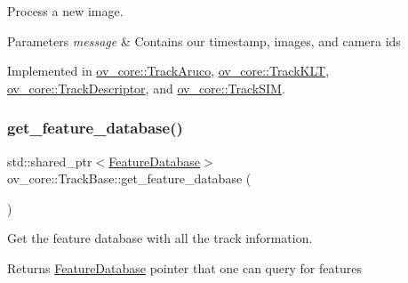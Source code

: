 Process a new image. 


\begin{DoxyParams}{Parameters}
{\em message} & Contains our timestamp, images, and camera ids \\
\hline
\end{DoxyParams}


Implemented in \hyperlink{classov__core_1_1TrackAruco_a8c6b74f31cabe516bb9ceb2d2326a2a9}{ov\+\_\+core\+::\+Track\+Aruco}, \hyperlink{classov__core_1_1TrackKLT_a8cb9c3595fbbddc9a563137cd06b07cf}{ov\+\_\+core\+::\+Track\+K\+LT}, \hyperlink{classov__core_1_1TrackDescriptor_afcbf3078992f740582eac24e3164e6f1}{ov\+\_\+core\+::\+Track\+Descriptor}, and \hyperlink{classov__core_1_1TrackSIM_a4c1537c48eec664a2c83dacc4b7e5778}{ov\+\_\+core\+::\+Track\+S\+IM}.

\mbox{\label{classov__core_1_1TrackBase_aebcef580e2c1639d45bcb74e2bc516aa}} 
\subsubsection{\texorpdfstring{get\+\_\+feature\+\_\+database()}{get\_feature\_database()}}
{\footnotesize\ttfamily std\+::shared\+\_\+ptr$<$\hyperlink{classov__core_1_1FeatureDatabase}{Feature\+Database}$>$ ov\+\_\+core\+::\+Track\+Base\+::get\+\_\+feature\+\_\+database (\begin{DoxyParamCaption}{ }\end{DoxyParamCaption})\hspace{0.3cm}{\ttfamily [inline]}}



Get the feature database with all the track information. 

\begin{DoxyReturn}{Returns}
\hyperlink{classov__core_1_1FeatureDatabase}{Feature\+Database} pointer that one can query for features 
\end{DoxyReturn}
